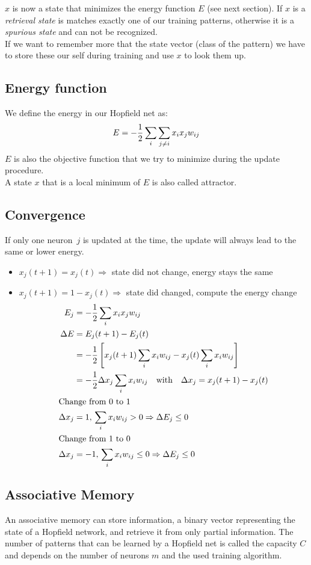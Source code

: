 $x$ is now a state that minimizes the energy function $E$ (see next section). If $x$ is a \emph{retrieval state} is matches exactly one of our training patterns, otherwise it is a \emph{spurious state} and can not be recognized.\\
If we want to remember more that the state vector (\eg class of the pattern) we have to store these our self during training and use $x$ to look them up.

\subsection{Energy function}
We define the energy in our Hopfield net as:
\begin{equation}
E = -\frac{1}{2} \sum_i \sum_{j\neq i} x_i x_j w_{ij}
\end{equation}
$E$ is also the objective function that we try to minimize during the update procedure.\\
A state $x$ that is a local minimum of $E$ is also called attractor.

\subsection{Convergence}
If only one neuron~$j$ is updated at the time, the update will always lead to the same or lower energy.
\begin{itemize}
\item $x_j(t+1) = x_j(t) \Rightarrow$ state did not change, energy stays the same
\item $x_j(t+1) = 1 - x_j(t) \Rightarrow$ state did changed, compute the energy change
	\begin{align}
	E_j &= -\frac{1}{2} \sum_i x_i x_j w_{ij}\\
	\Delta E &= E_j(t+1) - E_j(t)\\
	&= -\frac{1}{2} \left[ x_j(t+1) \sum_i x_i w_{ij} - x_j(t) \sum_i x_i w_{ij} \right]\\
	&= -\frac{1}{2} \Delta x_j \sum_i x_i w_{ij} \quad\text{with}\quad	\Delta x_j = x_j(t+1) - x_j(t)\\
	\intertext{Change from 0 to 1}
	\Delta x_j &= 1,\,\sum_i x_i w_{ij} > 0 \Rightarrow \Delta E_j \leq 0\\
	\intertext{Change from 1 to 0}
	\Delta x_j &= -1,\,\sum_i x_i w_{ij} \leq 0 \Rightarrow \Delta E_j \leq 0
	\end{align}
\end{itemize}

\subsection{Associative Memory}
An associative memory can store information, \eg a binary vector representing the state of a Hopfield network, and retrieve it from only partial information. The number of patterns that can be learned by a Hopfield net is called the capacity $C$ and depends on the number of neurons $m$ and the used training algorithm.

